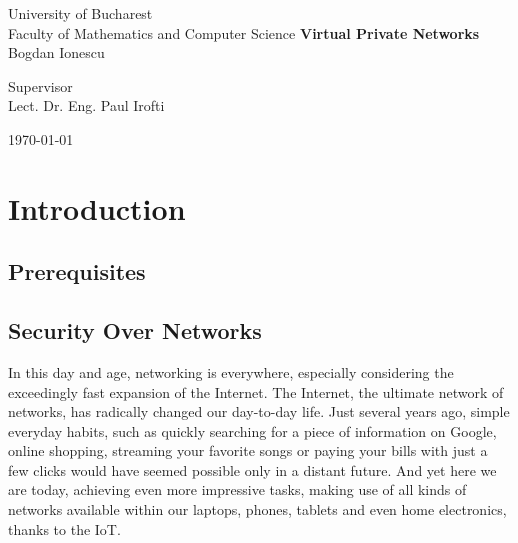 \documentclass[a4paper,12pt]{report}
\begin{document}
	\begin{titlepage}
		\begin{center}
			\vspace{-10in}
			{\LARGE University of Bucharest \\
			Faculty of Mathematics and Computer Science }
			\vfill
			\textbf{\huge Virtual Private Networks} \\
			\vspace{5mm}
			{\Large Bogdan Ionescu} \\
			\vspace{20mm}
			\begin{flushleft}{\large Supervisor \\
			Lect. Dr. Eng. Paul Irofti}
			\end{flushleft}
			\vfill
			\today
		\restoregeometry
		\end{center}
	\end{titlepage}
	\author{Bogdan Ionescu}
	\date{\today}
	
	\begin{abstract}
		This thesis aims to describe different potential security risks when using public networks, such as the Internet, as well as methods on how they can be avoided. The first chapter presents the dangers while traversing public networks and how VPNs make use of tunneling protocols to mitigate them. The second chapter takes a deep dive into the IPsec protocol suite, which is widely employed for establishing VPNs, and many other security services. 
	\end{abstract}		
	
	\tableofcontents
	
	\setlength{\glsdescwidth}{\hsize}
	\glsaddall
	\printglossary[type=\acronymtype,nonumberlist,style=long]
	
	\chapter{Introduction}
	\section{Prerequisites}	
	
	\section{Security Over Networks}
		
	In this day and age, networking is everywhere, especially considering the exceedingly fast expansion of the Internet. The Internet, the ultimate network of networks, has radically changed our day-to-day life. Just several years ago, simple everyday habits, such as quickly searching for a piece of information on Google, online shopping, streaming your favorite songs or paying your bills with just a few clicks would have seemed possible only in a distant future. And yet here we are today, achieving even more impressive tasks, making use of all kinds of networks available within our laptops, phones, tablets and even home electronics, thanks to the IoT.
		
\end{document}
